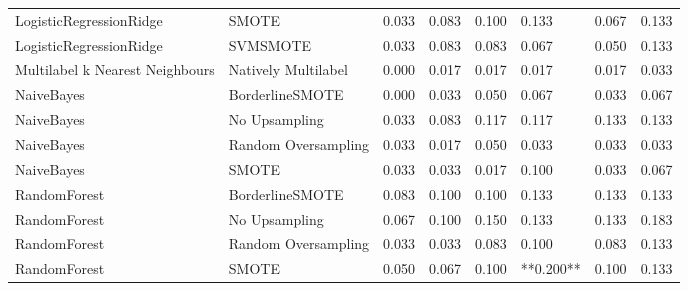 \begin{tabular}{llllllll}
        LogisticRegressionRidge &                         SMOTE & 0.033 &                     0.083 &                 0.100 &                  0.133 &                                   0.067 &    0.133 \\
        LogisticRegressionRidge &                      SVMSMOTE & 0.033 &                     0.083 &                 0.083 &                  0.067 &                                   0.050 &    0.133 \\
Multilabel k Nearest Neighbours &           Natively Multilabel & 0.000 &                     0.017 &                 0.017 &                  0.017 &                                   0.017 &    0.033 \\
                     NaiveBayes &               BorderlineSMOTE & 0.000 &                     0.033 &                 0.050 &                  0.067 &                                   0.033 &    0.067 \\
                     NaiveBayes &                 No Upsampling & 0.033 &                     0.083 &                 0.117 &                  0.117 &                                   0.133 &    0.133 \\
                     NaiveBayes &           Random Oversampling & 0.033 &                     0.017 &                 0.050 &                  0.033 &                                   0.033 &    0.033 \\
                     NaiveBayes &                         SMOTE & 0.033 &                     0.033 &                 0.017 &                  0.100 &                                   0.033 &    0.067 \\
                   RandomForest &               BorderlineSMOTE & 0.083 &                     0.100 &                 0.100 &                  0.133 &                                   0.133 &    0.133 \\
                   RandomForest &                 No Upsampling & 0.067 &                     0.100 &                 0.150 &                  0.133 &                                   0.133 &    0.183 \\
                   RandomForest &           Random Oversampling & 0.033 &                     0.033 &                 0.083 &                  0.100 &                                   0.083 &    0.133 \\
                   RandomForest &                         SMOTE & 0.050 &                     0.067 &                 0.100 &              **0.200** &                                   0.100 &    0.133 \\

\end{tabular}
